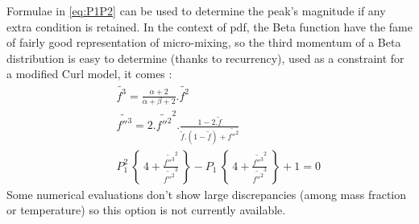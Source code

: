 Formulae in \eqref{eq:P1P2} can be used to determine the peak's magnitude if any
extra condition is retained. In the context of pdf, the Beta function have the
fame of fairly good representation of micro-mixing, so the third momentum of a
Beta distribution is easy to determine (thanks to recurrency), used as a
constraint for a modified Curl model, it comes :
\begin{eqnarray}
&&\widetilde{f^3}     = \frac{\alpha +2}{\alpha+\beta+2} .\widetilde{f^2}  \label{Eqs_xx7}\\
&&\widetilde{f{''}^3} =2 . \widetilde{f{''}^2}^2 . \frac{1-2.\tilde{f}}{\tilde{f}.(1-\tilde{f})+\widetilde{f{''}^2}}  \label{Eqs_xx8}\\
&&P_1^2~\left\{~          4+\frac{\widetilde{f{''}^3}^2}{\widetilde{f{''}^2}^3}~\right\}
                 -P_1~\left\{~ 4+\frac{\widetilde{f{''}^3}^2}{\widetilde{f{''}^2}^3}~\right\}+1=0 \label{Eqs_xx9}
\end{eqnarray}
Some numerical evaluations don't show large discrepancies ({\small among mass fraction or temperature}) so this option is not currently available.

\newpage

